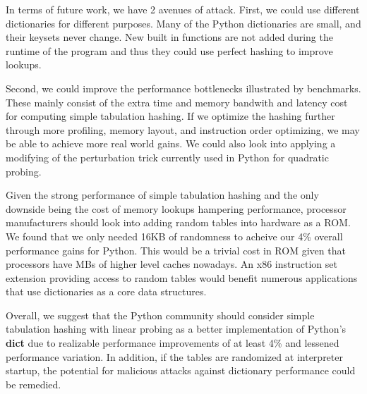 \documentclass[runningheads,a4paper]{llncs}
\begin{document}

In terms of future work, we have 2 avenues of attack. First, we could use
different dictionaries for different purposes. Many of the Python dictionaries
are small, and their keysets never change. New built in functions are not added
during the runtime of the program and thus they could use perfect hashing to improve lookups.

Second, we could improve the performance bottlenecks illustrated by benchmarks.
These mainly consist of the extra time and memory bandwith and latency cost for
computing simple tabulation hashing.  If we optimize the hashing further
through more profiling, memory layout, and instruction order optimizing, we may
be able to achieve more real world gains.  We could also look into applying a
modifying of the perturbation trick currently used in Python for quadratic
probing.

Given the strong performance of simple tabulation hashing and the only downside
being the cost of memory lookups hampering performance, processor manufacturers should look into
adding random tables into hardware as a ROM.  We found that we only needed 16KB of randomness to acheive our 4\% overall performance gains for Python. This would be a trivial
cost in ROM given that processors have MBs of higher level caches nowadays.  An x86 instruction set extension providing access to random tables would benefit numerous applications that use dictionaries as a core data structures.

Overall, we suggest that the Python community should consider simple tabulation hashing with linear probing as a better implementation of Python's \textbf{dict} due to realizable performance improvements of at least 4\% and lessened performance variation.  In addition, if the tables are randomized at interpreter startup, the potential for malicious attacks against dictionary performance could be remedied.
{}

\end{document}
